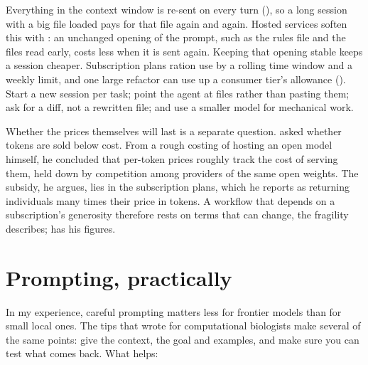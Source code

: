 Everything in the context window is re-sent on every turn (), so
a long session with a big file loaded pays for that file again and again.
Hosted services soften this with : an unchanged opening
of the prompt, such as the rules file and the files read early, costs less
when it is sent again. Keeping that opening stable keeps a session cheaper.
Subscription plans ration use by a rolling time window and a weekly limit,
and one large refactor can use up a consumer tier's allowance
(). Start a new session per task; point the agent at
files rather than pasting them; ask for a diff, not a rewritten file; and use
a smaller model for mechanical work.

Whether the prices themselves will last is a separate question.
\textcite{wickham2026tokencost} asked whether tokens are sold below cost. From
a rough costing of hosting an open model himself, he concluded that per-token
prices roughly track the cost of serving them, held down by competition among
providers of the same open weights. The subsidy, he argues, lies in the
subscription plans, which he reports as returning individuals many times
their price in tokens. A workflow that depends on a subscription's generosity
therefore rests on terms that can change, the fragility 
describes;  has his figures.

\section{Prompting, practically}

In my experience, careful prompting matters less for frontier models than for
small local ones. The tips that \textcite{lubiana2023tips} wrote for
computational biologists make several of the same points: give the context,
the goal and examples, and make sure you can test what comes back. What
helps:

